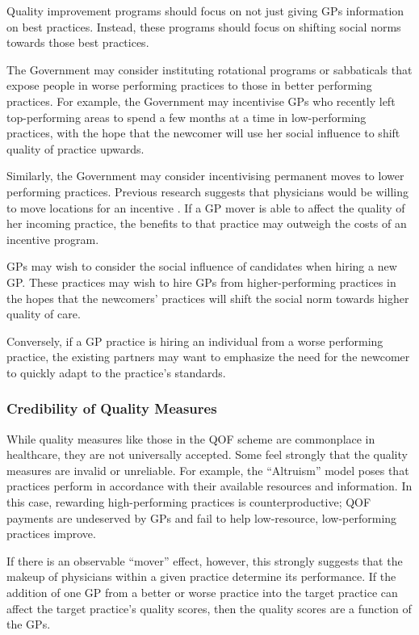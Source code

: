 \documentclass[12pt]{article}
\begin{document}
Quality improvement programs should focus on not just giving GPs information on best practices. Instead, these programs should focus on shifting social norms towards those best practices.

The Government may consider instituting rotational programs or sabbaticals that expose people in worse performing practices to those in better performing practices. For example, the Government may incentivise GPs who recently left top-performing areas to spend a few months at a time in low-performing practices, with the hope that the newcomer will use her social influence to shift quality of practice upwards.

Similarly, the Government may consider incentivising permanent moves to lower performing practices. Previous research suggests that physicians would be willing to move locations for an incentive \citep{scottGettingDoctorsBush2013}. If a GP mover is able to affect the quality of her incoming practice, the benefits to that practice may outweigh the costs of an incentive program.

GPs may wish to consider the social influence of candidates when hiring a new GP. These practices may wish to hire GPs from higher-performing practices in the hopes that the newcomers' practices will shift the social norm towards higher quality of care.

Conversely, if a GP practice is hiring an individual from a worse performing practice, the existing partners may want to emphasize the need for the newcomer to quickly adapt to the practice's standards.

\subsubsection{Credibility of Quality Measures}
While quality measures like those in the QOF scheme are commonplace in healthcare, they are not universally accepted. Some feel strongly that the quality measures are invalid or unreliable. For example, the ``Altruism'' model poses that practices perform in accordance with their available resources and information. In this case, rewarding high-performing practices is counterproductive; QOF payments are undeserved by GPs and fail to help low-resource, low-performing practices improve.

If there is an observable ``mover'' effect, however, this strongly suggests that the makeup of physicians within a given practice determine its performance. If the addition of one GP from a better or worse practice into the target practice can affect the target practice's quality scores, then the quality scores are a function of the GPs.
\end{document}
